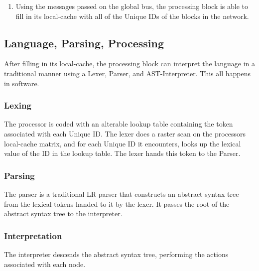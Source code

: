 \begin{enumerate}
\begin{enumerate}
          \item Until the end of the line is reached, whenever a block receives a vector from its western neighbor, each block increments the x component of its position vector, emits a message on the global bus containing \begin{verbatim}[position vector, unique ID]\end{verbatim}then passes its position vector to its eastern neighbor.
          \item The last block on the line increments the x component of its position vector, then emits a message on the global bus containing \begin{verbatim}[position vector, unique ID, END_OF_DIMENSION]\end{verbatim}
        \end{enumerate}
      \item Using the messages passed on the global bus, the processing block is able to fill in its local-cache with all of the Unique IDs of the blocks in the network.
      \end{enumerate}
  \subsection{Language, Parsing, Processing}
    After filling in its local-cache, the processing block can interpret the language in a traditional manner using a Lexer, Parser, and AST-Interpreter. This all happens in software.
    \subsubsection{Lexing}
      The processor is coded with an alterable lookup table containing the token associated with each Unique ID. The lexer does a raster scan on the processors local-cache matrix, and for each Unique ID it encounters, looks up the lexical value of the ID in the lookup table. The lexer hands this token to the Parser.
    \subsubsection{Parsing}
      The parser is a traditional LR parser that constructs an abstract syntax tree from the lexical tokens handed to it by the lexer. It passes the root of the abstract syntax tree to the interpreter.
    \subsubsection{Interpretation}
      The interpreter descends the abstract syntax tree, performing the actions associated with each node.

